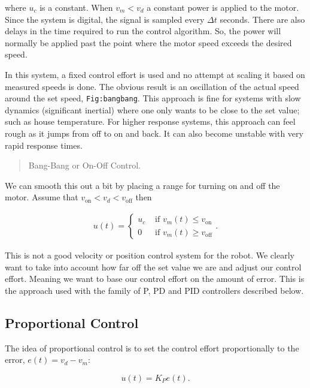 where \(u_c\) is a constant. When \(v_m < v_d\) a constant power is
applied to the motor. Since the system is digital, the signal is sampled
every \(\Delta t\) seconds. There are also delays in the time required
to run the control algorithm. So, the power will normally be applied
past the point where the motor speed exceeds the desired speed.

In this system, a fixed control effort is used and no attempt at scaling
it based on measured speeds is done. The obvious result is an
oscillation of the actual speed around the set speed,
\texttt{Fig:bangbang}. This approach is fine for systems with slow
dynamics (significant inertial) where one only wants to be close to the
set value; such as house temperature. For higher response systems, this
approach can feel rough as it jumps from off to on and back. It can also
become unstable with very rapid response times.

\begin{quote}
Bang-Bang or On-Off Control.
\end{quote}

We can smooth this out a bit by placing a range for turning on and off
the motor. Assume that \(v_{\mbox{on}} < v_d < v_{\mbox{off}}\) then

\[\begin{aligned}
u(t) = \left\{ \begin{array}{lr} u_c & \mbox{~if~} v_m(t) \leq v_{\mbox{on}}  \\  0 & \mbox{~if~} v_m(t)\geq v_{\mbox{off}} \end{array} \right.   .
\end{aligned}\]

This is not a good velocity or position control system for the robot. We
clearly want to take into account how far off the set value we are and
adjust our control effort. Meaning we want to base our control effort on
the amount of error. This is the approach used with the family of P, PD
and PID controllers described below.

\hypertarget{proportional-control}{%
\subsection{Proportional Control}\label{proportional-control}}

The idea of proportional control is to set the control effort
proportionally to the error, \(e(t) = v_d - v_m\):

\[u(t) = K_P e(t) .\]


